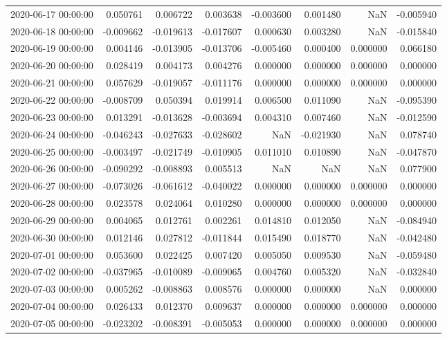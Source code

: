 \begin{tabular}{lrrrrrrr}
2020-06-17 00:00:00 & 0.050761 & 0.006722 & 0.003638 & -0.003600 & 0.001480 & NaN & -0.005940 \\
2020-06-18 00:00:00 & -0.009662 & -0.019613 & -0.017607 & 0.000630 & 0.003280 & NaN & -0.015840 \\
2020-06-19 00:00:00 & 0.004146 & -0.013905 & -0.013706 & -0.005460 & 0.000400 & 0.000000 & 0.066180 \\
2020-06-20 00:00:00 & 0.028419 & 0.004173 & 0.004276 & 0.000000 & 0.000000 & 0.000000 & 0.000000 \\
2020-06-21 00:00:00 & 0.057629 & -0.019057 & -0.011176 & 0.000000 & 0.000000 & 0.000000 & 0.000000 \\
2020-06-22 00:00:00 & -0.008709 & 0.050394 & 0.019914 & 0.006500 & 0.011090 & NaN & -0.095390 \\
2020-06-23 00:00:00 & 0.013291 & -0.013628 & -0.003694 & 0.004310 & 0.007460 & NaN & -0.012590 \\
2020-06-24 00:00:00 & -0.046243 & -0.027633 & -0.028602 & NaN & -0.021930 & NaN & 0.078740 \\
2020-06-25 00:00:00 & -0.003497 & -0.021749 & -0.010905 & 0.011010 & 0.010890 & NaN & -0.047870 \\
2020-06-26 00:00:00 & -0.090292 & -0.008893 & 0.005513 & NaN & NaN & NaN & 0.077900 \\
2020-06-27 00:00:00 & -0.073026 & -0.061612 & -0.040022 & 0.000000 & 0.000000 & 0.000000 & 0.000000 \\
2020-06-28 00:00:00 & 0.023578 & 0.024064 & 0.010280 & 0.000000 & 0.000000 & 0.000000 & 0.000000 \\
2020-06-29 00:00:00 & 0.004065 & 0.012761 & 0.002261 & 0.014810 & 0.012050 & NaN & -0.084940 \\
2020-06-30 00:00:00 & 0.012146 & 0.027812 & -0.011844 & 0.015490 & 0.018770 & NaN & -0.042480 \\
2020-07-01 00:00:00 & 0.053600 & 0.022425 & 0.007420 & 0.005050 & 0.009530 & NaN & -0.059480 \\
2020-07-02 00:00:00 & -0.037965 & -0.010089 & -0.009065 & 0.004760 & 0.005320 & NaN & -0.032840 \\
2020-07-03 00:00:00 & 0.005262 & -0.008863 & 0.008576 & 0.000000 & 0.000000 & NaN & 0.000000 \\
2020-07-04 00:00:00 & 0.026433 & 0.012370 & 0.009637 & 0.000000 & 0.000000 & 0.000000 & 0.000000 \\
2020-07-05 00:00:00 & -0.023202 & -0.008391 & -0.005053 & 0.000000 & 0.000000 & 0.000000 & 0.000000 \\

\end{tabular}
